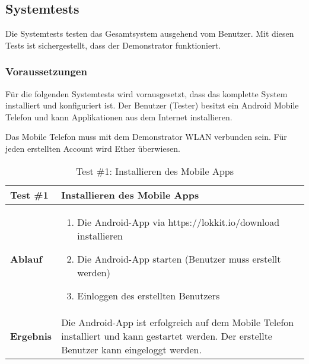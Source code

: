 \subsection{Systemtests}
Die Systemtests testen das Gesamtsystem ausgehend vom Benutzer. Mit diesen Tests ist sichergestellt, dass der Demonstrator funktioniert.

\subsubsection{Voraussetzungen}
Für die folgenden Systemtests wird vorausgesetzt, dass das komplette System installiert und konfiguriert ist. Der Benutzer (Tester) besitzt ein Android Mobile Telefon und kann Applikationen aus dem Internet installieren.

Das Mobile Telefon muss mit dem Demonstrator WLAN verbunden sein.
Für jeden erstellten Account wird Ether überwiesen.


\begin{table}[H]
\centering
\caption{Test \#1: Installieren des Mobile Apps}
\label{my-label}
\begin{tabular}{@{}L{1.6cm}L{11cm}@{}}
\toprule
\textbf{Test \#1}
& Installieren des Mobile Apps
\\ \midrule
\textbf{Ablauf}
& 
\begin{enumerate}
    \item Die Android-App via https://lokkit.io/download installieren
    \item Die Android-App starten (Benutzer muss erstellt werden)
    \item Einloggen des erstellten Benutzers
\end{enumerate}
\\ \midrule
\textbf{Ergebnis}
& Die Android-App ist erfolgreich auf dem Mobile Telefon installiert und kann gestartet werden. Der erstellte Benutzer kann eingeloggt werden.
\\ \bottomrule
\end{tabular}
\end{table}


